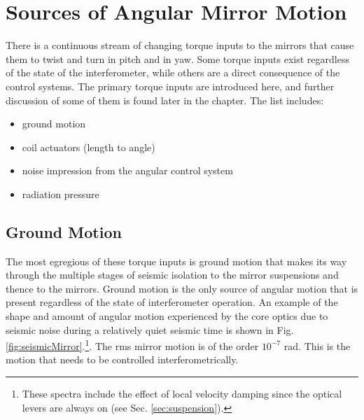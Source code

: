 \section{Sources of Angular Mirror Motion}
There is a continuous stream of changing torque inputs to the mirrors that cause them to twist and turn in pitch and in yaw. Some torque inputs exist regardless of the state of the interferometer, while others are a direct consequence of the control systems. The primary torque inputs are introduced here, and further discussion of some of them is found later in the chapter. The list includes:
\begin{itemize}
\item ground motion \vspace{-10pt} 
\item coil actuators (length to angle) \vspace{-10pt}
\item noise impression from the angular control system \vspace{-10pt}
\item radiation pressure
\end{itemize}




\subsection{Ground Motion} 
The most egregious of these torque inputs is ground motion that makes its way through the multiple stages of seismic isolation to the mirror suspensions and thence to the mirrors. Ground motion is the only source of angular motion that is present regardless of the state of interferometer operation. An example of the shape and amount of angular motion experienced by the core optics due to seismic noise during a relatively quiet seismic time is shown in Fig. \ref{fig:seismicMirror}.\footnote{These spectra include the effect of local velocity damping since the optical levers are always on (see Sec. \ref{sec:suspension}).}. The rms mirror motion is of the order $10^{-7}$ rad. This is the motion that needs to be controlled interferometrically.


